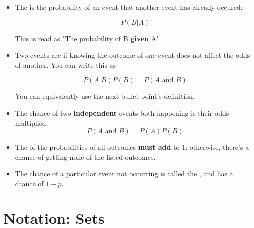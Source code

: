 \begin{itemize}
        \item The  is the probability of an event  that another event has already occured:
        
            \begin{equation}
                P(B|A)
            \end{equation}
            
        This is read as "The probability of B \textbf{given} A".
        
        \item Two events are  if knowing the outcome of one event does not affect the odds of another. You can write this as 
        
            \begin{equation}
                P(A|B)P(B)=P(A \text{ and } B)
            \end{equation}
            
            You can equivalently use the next bullet point's definition.
        
        \item The chance of two \textbf{independent} events both happening is their odds multiplied.
            \begin{equation}
                P(A \text{ and } B) = P(A)P(B)
            \end{equation}
            
            
        \item The  of the probabilities of all outcomes \textbf{must add} to 1: otherwise, there's a chance of getting none of the listed outcomes.
        
        \item The chance of a particular event not occurring is called the , and has a chance of $1-p$.
        
        
            
    \end{itemize}
    
\section{Notation: Sets}

